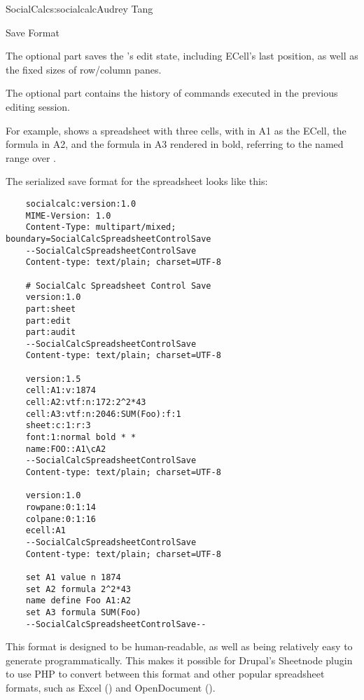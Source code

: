 \begin{aosachapter}{SocialCalc}{s:socialcalc}{Audrey Tang}
\begin{aosasect1}{Save Format}
\begin{aosaitemize}
  \item The optional  part saves the 's
  edit state, including ECell's last position, as well as the fixed sizes of
  row/column panes.

  \item The optional  part contains the history of
 commands executed in the previous editing session.

\end{aosaitemize}

For example,  shows a spreadsheet with three
cells, with  in A1 as the ECell, the formula 
in A2, and the formula  in A3 rendered in bold,
referring to the named range  over .


The serialized save format for the spreadsheet looks like this:

\begin{verbatim}
    socialcalc:version:1.0
    MIME-Version: 1.0
    Content-Type: multipart/mixed; boundary=SocialCalcSpreadsheetControlSave
    --SocialCalcSpreadsheetControlSave
    Content-type: text/plain; charset=UTF-8

    # SocialCalc Spreadsheet Control Save
    version:1.0
    part:sheet
    part:edit
    part:audit
    --SocialCalcSpreadsheetControlSave
    Content-type: text/plain; charset=UTF-8

    version:1.5
    cell:A1:v:1874
    cell:A2:vtf:n:172:2^2*43
    cell:A3:vtf:n:2046:SUM(Foo):f:1
    sheet:c:1:r:3
    font:1:normal bold * *
    name:FOO::A1\cA2
    --SocialCalcSpreadsheetControlSave
    Content-type: text/plain; charset=UTF-8

    version:1.0
    rowpane:0:1:14
    colpane:0:1:16
    ecell:A1
    --SocialCalcSpreadsheetControlSave
    Content-type: text/plain; charset=UTF-8

    set A1 value n 1874
    set A2 formula 2^2*43
    name define Foo A1:A2
    set A3 formula SUM(Foo)
    --SocialCalcSpreadsheetControlSave--
\end{verbatim}

\noindent This format is designed to be human-readable, as well as being
relatively easy to generate programmatically.  This makes it possible
for Drupal's Sheetnode plugin to use PHP to convert
between this format and other popular spreadsheet formats, such as
Excel () and OpenDocument ().


\end{aosasect1}
\end{aosachapter}
